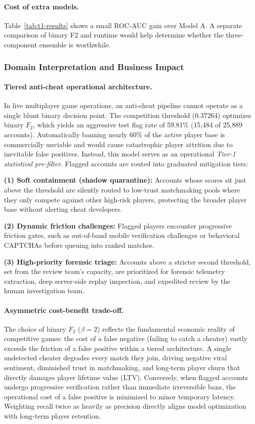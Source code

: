 \documentclass[../main.tex]{subfiles}
\begin{document}
\paragraph{Cost of extra models.} Table~\ref{tab:t1-results} shows a small ROC-AUC gain over Model A. A separate comparison of binary F2 and runtime would help determine whether the three-component ensemble is worthwhile.

\subsubsection{Domain Interpretation and Business Impact}

\paragraph{Tiered anti-cheat operational architecture.} In live multiplayer game operations, an anti-cheat pipeline cannot operate as a single blunt binary decision point. The competition threshold (0.37264) optimizes binary $F_2$, which yields an aggressive test flag rate of 59.81\% (15{,}484 of 25{,}889 accounts). Automatically banning nearly 60\% of the active player base is commercially unviable and would cause catastrophic player attrition due to inevitable false positives. Instead, this model serves as an operational \emph{Tier-1 statistical pre-filter}. Flagged accounts are routed into graduated mitigation tiers:

\textbf{(1) Soft containment (shadow quarantine):} Accounts whose scores sit just above the threshold are silently routed to low-trust matchmaking pools where they only compete against other high-risk players, protecting the broader player base without alerting cheat developers.

\textbf{(2) Dynamic friction challenges:} Flagged players encounter progressive friction gates, such as out-of-band mobile verification challenges or behavioral CAPTCHAs before queuing into ranked matches.

\textbf{(3) High-priority forensic triage:} Accounts above a stricter second threshold, set from the review team's capacity, are prioritized for forensic telemetry extraction, deep server-side replay inspection, and expedited review by the human investigation team.

\paragraph{Asymmetric cost-benefit trade-off.} The choice of binary $F_2$ ($\beta = 2$) reflects the fundamental economic reality of competitive games: the cost of a false negative (failing to catch a cheater) vastly exceeds the friction of a false positive within a tiered architecture. A single undetected cheater degrades every match they join, driving negative viral sentiment, diminished trust in matchmaking, and long-term player churn that directly damages player lifetime value (LTV). Conversely, when flagged accounts undergo progressive verification rather than immediate irreversible bans, the operational cost of a false positive is minimized to minor temporary latency. Weighting recall twice as heavily as precision directly aligns model optimization with long-term player retention.
\end{document}

